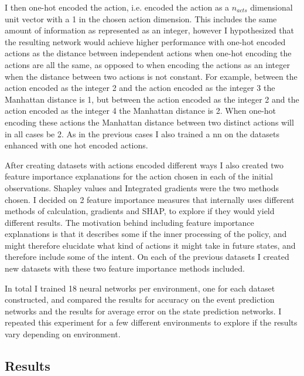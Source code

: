 \documentclass[UKenglish]{uiomasterthesis}
\begin{document}
I then one-hot encoded the action, i.e. encoded the action as a $n_{acts}$ dimensional unit vector with a 1 in the chosen action dimension. This includes the same amount of information as represented as an integer, however I hypothesized that the resulting network would achieve higher performance with one-hot encoded actions as the distance between independent actions when one-hot encoding the actions are all the same, as opposed to when encoding the actions as an integer when the distance between two actions is not constant. For example, between the action encoded as the integer 2 and the action encoded as the integer 3 the Manhattan distance is 1, but between the action encoded as the integer 2 and the action encoded as the integer 4 the Manhattan distance is 2. When one-hot encoding these actions the Manhattan distance between two distinct actions will in all cases be 2. As in the previous cases I also trained a \ac{nn} on the datasets enhanced with one hot encoded actions.

After creating datasets with actions encoded different ways I also created two feature importance explanations for the action chosen in each of the initial observations. Shapley values and Integrated gradients were the two methods chosen. I decided on 2 feature importance measures that internally uses different methods of calculation, gradients and SHAP, to explore if they would yield different results. The motivation behind including feature importance explanations is that it describes some if the inner processing of the policy, and might therefore elucidate what kind of actions it might take in future states, and therefore include some of the intent. On each of the previous datasets I created new datasets with these two feature importance methods included.

In total I trained 18 neural networks per environment, one for each dataset constructed, and compared the results for accuracy on the event prediction networks and the results for average error on the state prediction networks. I repeated this experiment for a few different environments to explore if the results vary depending on environment.
\begin{figure}[!ht]
	
	\label{fig:pred_loss_action_ig} 
\end{figure}

\subsection{Results}
\end{document}
